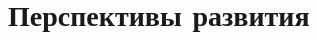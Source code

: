 \documentclass[a4paper,10pt]{extarticle}
\begin{document}

\section{Перспективы развития}


\end{document}
